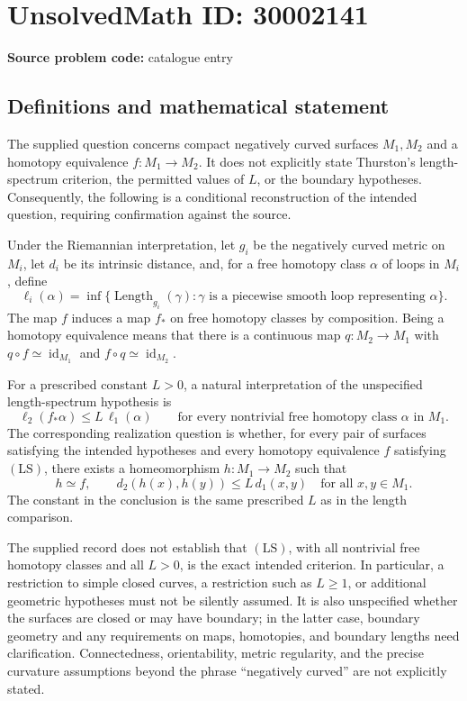 \documentclass[11pt]{article}
\begin{document}
\section*{UnsolvedMath ID: 30002141}
\textbf{Source problem code:} catalogue entry
\subsection{Definitions and mathematical statement}
The supplied question concerns compact negatively curved surfaces \(M_1,M_2\) and a homotopy equivalence \(f:M_1\to M_2\). It does not explicitly state Thurston's length-spectrum criterion, the permitted values of \(L\), or the boundary hypotheses. Consequently, the following is a conditional reconstruction of the intended question, requiring confirmation against the source.

Under the Riemannian interpretation, let \(g_i\) be the negatively curved metric on \(M_i\), let \(d_i\) be its intrinsic distance, and, for a free homotopy class \(\alpha\) of loops in \(M_i\), define
\[
\ell_i(\alpha)=\inf\{\operatorname{Length}_{g_i}(\gamma):\gamma\text{ is a piecewise smooth loop representing }\alpha\}.
\]
The map \(f\) induces a map \(f_*\) on free homotopy classes by composition. Being a homotopy equivalence means that there is a continuous map \(q:M_2\to M_1\) with \(q\circ f\simeq\operatorname{id}_{M_1}\) and \(f\circ q\simeq\operatorname{id}_{M_2}\).

For a prescribed constant \(L>0\), a natural interpretation of the unspecified length-spectrum hypothesis is
\[
\ell_2(f_*\alpha)\leq L\,\ell_1(\alpha)
\qquad\text{for every nontrivial free homotopy class }\alpha\text{ in }M_1.
\tag{LS}
\]
The corresponding realization question is whether, for every pair of surfaces satisfying the intended hypotheses and every homotopy equivalence \(f\) satisfying \((\mathrm{LS})\), there exists a homeomorphism \(h:M_1\to M_2\) such that
\[
h\simeq f,
\qquad
d_2(h(x),h(y))\leq L\,d_1(x,y)
\quad\text{for all }x,y\in M_1.
\]
The constant in the conclusion is the same prescribed \(L\) as in the length comparison.

The supplied record does not establish that \((\mathrm{LS})\), with all nontrivial free homotopy classes and all \(L>0\), is the exact intended criterion. In particular, a restriction to simple closed curves, a restriction such as \(L\geq1\), or additional geometric hypotheses must not be silently assumed. It is also unspecified whether the surfaces are closed or may have boundary; in the latter case, boundary geometry and any requirements on maps, homotopies, and boundary lengths need clarification. Connectedness, orientability, metric regularity, and the precise curvature assumptions beyond the phrase ``negatively curved'' are not explicitly stated.
\end{document}
